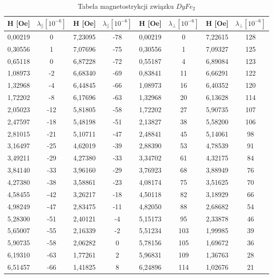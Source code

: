 \documentclass[a4paper,12pt]{article}
\numberwithin{equation}{section}
\begin{document}
\begin{appendices}
  \label{DyMagnetoTab}
  \scriptsize
  \begin{longtable}[c]{|c|c|c|c|c|c|c|c|}
\caption{Tabela magnetostrykcji związku $DyFe_2$}\\
\hline
H [Oe]	&	$\lambda_{||} [10^{-6}]	$ 	&	H [Oe]	&	$\lambda_{||}  [10^{-6}]	$	&	H [Oe]	&	$\lambda_{\perp}  [10^{-6}]$		&	H [Oe]	&	$\lambda_{\perp} [10^{-6}]$	\\\hline\hline
0,00219	&	0	&	7,23095	&	-78	&		0,00219	&	0	&	7,22615	&	128	\\\hline
0,30556	&	1	&	7,07696	&	-75	&		0,30556	&	1	&	7,09327	&	125	\\\hline
0,65118	&	0	&	6,87228	&	-72	&		0,55187	&	4	&	6,89084	&	123	\\\hline
1,08973	&	-2	&	6,68340	&	-69	&		0,83841	&	11	&	6,66291	&	122	\\\hline
1,32968	&	-4	&	6,44845	&	-66	&		1,08973	&	16	&	6,40352	&	120	\\\hline
1,72202	&	-8	&	6,17696	&	-63	&		1,32968	&	20	&	6,13628	&	114	\\\hline
2,05023	&	-12	&	5,81805	&	-58	&		1,72202	&	27	&	5,90735	&	107	\\\hline
2,47597	&	-18	&	5,48198	&	-51	&		2,13827	&	38	&	5,58200	&	106	\\\hline
2,81015	&	-21	&	5,10711	&	-47	&		2,48841	&	45	&	5,14061	&	98	\\\hline
3,16497	&	-25	&	4,62019	&	-39	&		2,88390	&	53	&	4,78539	&	91	\\\hline
3,49211	&	-29	&	4,27380	&	-33	&		3,34702	&	61	&	4,32175	&	84	\\\hline
3,84140	&	-33	&	3,96160	&	-29	&		3,76923	&	68	&	3,88949	&	76	\\\hline
4,27380	&	-38	&	3,58861	&	-23	&		4,08174	&	75	&	3,51625	&	70	\\\hline
4,58455	&	-42	&	3,26217	&	-18	&		4,50118	&	82	&	3,18929	&	66	\\\hline
4,98249	&	-47	&	2,83475	&	-11	&		4,82050	&	88	&	2,68682	&	54	\\\hline
5,28300	&	-51	&	2,40121	&	-4	&		5,15173	&	95	&	2,33878	&	46	\\\hline
5,65007	&	-55	&	2,16339	&	-2	&		5,51234	&	103	&	1,99985	&	39	\\\hline
5,90735	&	-58	&	2,06282	&	0	&		5,78156	&	105	&	1,69672	&	36	\\\hline
6,19310	&	-63	&	1,77261	&	2	&		5,96831	&	109	&	1,36763	&	28	\\\hline
6,51457	&	-66	&	1,41825	&	8	&		6,24896	&	114	&	1,02676	&	21	\\\hline

\end{longtable}
\end{appendices}
\end{document}
